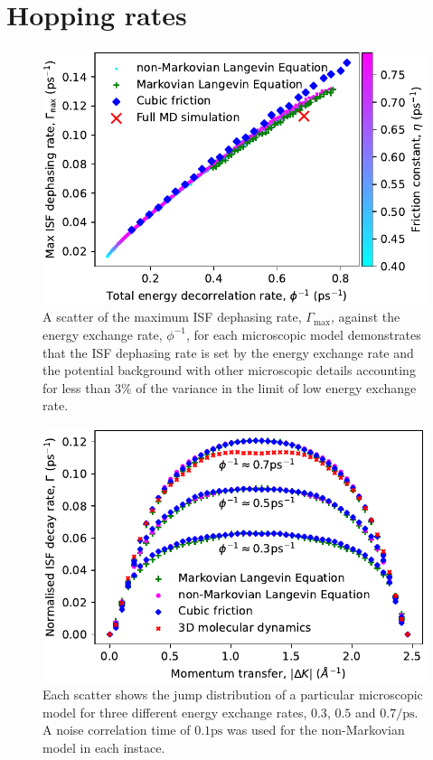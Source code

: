\documentclass[7pt]{article}
\newcommand{\ps}{\si{\pico\second}}
\newcommand{\ips}{\si{\per\pico\second}}
\begin{document}
\section*{Hopping rates}

\begin{figure}
	\centering
	\includegraphics[width=1.0\columnwidth]{gamma_ttf}
	\caption{A scatter of the maximum ISF dephasing rate, $\Gamma_{\text{max}}$, against the energy exchange rate, $\phi^{-1}$, for each microscopic model demonstrates that the ISF dephasing rate is set by the energy exchange rate and the potential background with other microscopic details accounting for less than $3\%$ of the variance in the limit of low energy exchange rate.}
	\label{fig:gamma_ttf}
\end{figure}

\begin{figure}
	\centering
	\includegraphics[width=1.0\columnwidth]{jump_distribution}
	\caption{Each scatter shows the jump distribution of a particular microscopic model for three different energy exchange rates, $0.3$, $0.5$ and $0.7\ips$. A noise correlation time of $0.1\ps$ was used for the non-Markovian model in each instace.} 
	\label{fig:jump_distribution}
\end{figure}
\end{document}
